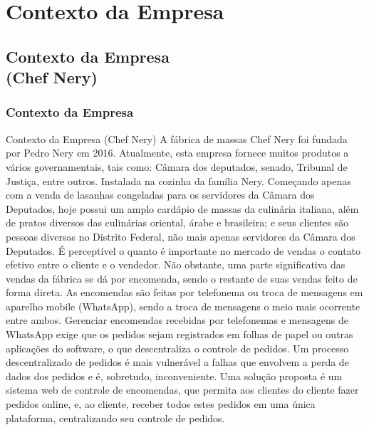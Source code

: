 \part{Contexto da Empresa}
\chapter[Contexto da Empresa]{Contexto da Empresa \\ (Chef Nery)}
{\large {\section { Contexto da Empresa \\ } } }

Contexto da Empresa (Chef Nery)
A fábrica de massas Chef Nery foi fundada por Pedro Nery em 2016. Atualmente,
esta empresa fornece muitos produtos a vários governamentais, tais como: Câmara dos
deputados, senado, Tribunal de Justiça, entre outros.
Instalada na cozinha da família Nery. Começando apenas com a venda de lasanhas
congeladas para os servidores da Câmara dos Deputados, hoje possui um amplo cardápio
de massas da culinária italiana, além de pratos diversos das culinárias oriental, árabe e
brasileira; e seus clientes são pessoas diversas no Distrito Federal, não mais apenas
servidores da Câmara dos Deputados.
É perceptível o quanto é importante no mercado de vendas o contato efetivo entre o
cliente e o vendedor. Não obstante, uma parte significativa das vendas da fábrica se dá por
encomenda, sendo o restante de suas vendas feito de forma direta. As encomendas são
feitas por telefonema ou troca de mensagens em aparelho mobile (WhatsApp), sendo a
troca de mensagens o meio mais ocorrente entre ambos.
Gerenciar encomendas recebidas por telefonemas e mensagens de WhatsApp exige
que os pedidos sejam registrados em folhas de papel ou outras aplicações do software, o
que descentraliza o controle de pedidos. Um processo descentralizado de pedidos é mais
vulnerável a falhas que envolvem a perda de dados dos pedidos e é, sobretudo,
inconveniente.
Uma solução proposta é um sistema web de controle de encomendas, que permita
aos clientes do cliente fazer pedidos online, e, ao cliente, receber todos estes pedidos em
uma única plataforma, centralizando seu controle de pedidos.
